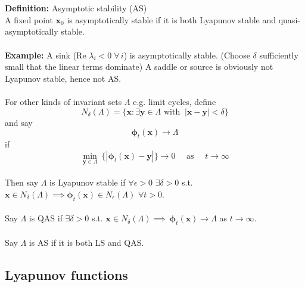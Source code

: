 \documentclass{article}
\newcommand{\bp}{\bm{\phi}}   %
\begin{document}
\\
\\
\textbf{Definition:} Asymptotic stability (AS)
\\
A fixed point $\bm{x}_0$ is asymptotically stable if it is both Lyapunov stable
and quasi-asymptotically stable.
\\
\\
\textbf{Example:} A sink (Re $\lambda_i <0 \; \forall \, i$) is asymptotically
stable. (Choose $\delta$ sufficiently small that the linear terms dominate)
A saddle or source is obviously not Lyapunov stable, hence not AS.
\\
\\
For other kinds of invariant sets $\Lambda$ e.g. limit cycles, define
\[ N_{\delta}(\Lambda) = \{ \bm{x} : \exists \bm{y} \in \Lambda \mbox{ with } \
|\bm{x} - \bm{y}| < \delta \} \]
and say 
\[ \bp_t(\bm{x}) \to \Lambda\]
if
\[\min_{\bm{y} \in \Lambda} \
\{ | \bp_t(\bm{x}) - \bm{y}| \} \to 0 \quad \mbox{ as } \quad t \to \infty \]
\\
Then say $\Lambda$ is Lyapunov stable if $\forall \epsilon > 0$ $\exists \delta>0$ s.t.
$\bm{x} \in N_{\delta}(\Lambda) \implies \bp_t(\bm{x}) \in N_{\epsilon}(\Lambda)$
$\forall t >0$.
\\
\\
Say $\Lambda$ is QAS if $\exists \delta >0$ s.t. $\bm{x} \in N_{\delta}(\Lambda) \implies \
\bp_t(\bm{x}) \to \Lambda$ as $t \to \infty$.
\\
\\
Say $\Lambda$ is AS if it is both LS and QAS.
\\
\subsection{Lyapunov functions}
\end{document}
